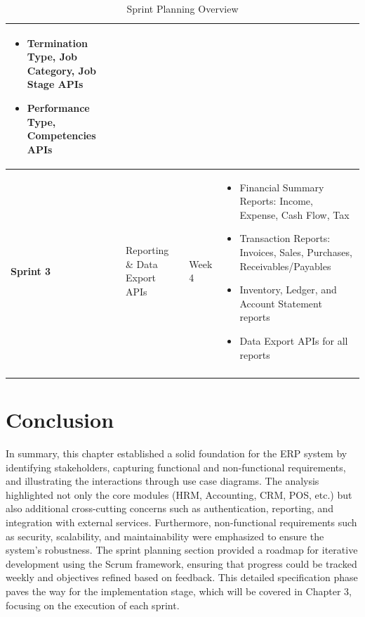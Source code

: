 \begin{longtable}{|p{1.5cm}|p{4cm}|p{2.5cm}|p{5.5cm}|}
\begin{itemize}
    \item Termination Type, Job Category, Job Stage APIs
    \item Performance Type, Competencies APIs
\end{itemize} \\
\hline
\textbf{Sprint 3} & Reporting \& Data Export APIs & Week 4 & 
\begin{itemize}
    \item Financial Summary Reports: Income, Expense, Cash Flow, Tax
    \item Transaction Reports: Invoices, Sales, Purchases, Receivables/Payables
    \item Inventory, Ledger, and Account Statement reports
    \item Data Export APIs for all reports
\end{itemize} \\
\hline
\caption{Sprint Planning Overview}
\label{tab:sprint_planning}
\end{longtable}

\section*{Conclusion}
In summary, this chapter established a solid foundation for the ERP system by identifying stakeholders, capturing functional and non-functional requirements, and illustrating the interactions through use case diagrams. 
The analysis highlighted not only the core modules (HRM, Accounting, CRM, POS, etc.) but also additional cross-cutting concerns such as authentication, reporting, and integration with external services. 
Furthermore, non-functional requirements such as security, scalability, and maintainability were emphasized to ensure the system’s robustness. 
The sprint planning section provided a roadmap for iterative development using the Scrum framework, ensuring that progress could be tracked weekly and objectives refined based on feedback. 
This detailed specification phase paves the way for the implementation stage, which will be covered in Chapter 3, focusing on the execution of each sprint.